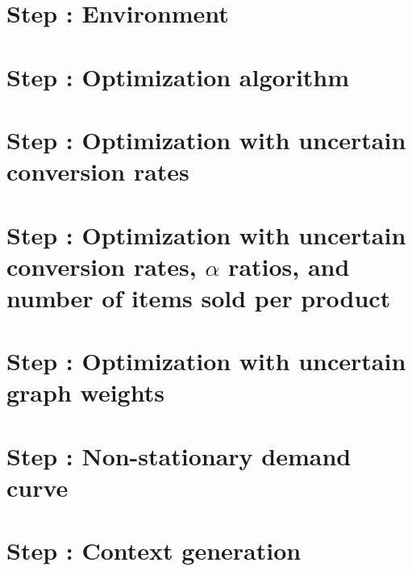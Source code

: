 \documentclass{article}
\begin{document}
\section{Step : Environment}



\newpage
\section{Step : Optimization algorithm}



\newpage
\section{Step : Optimization with uncertain conversion rates}



\newpage
\section{Step : Optimization with uncertain conversion rates, $\alpha$ ratios, and number of items sold per product}


\newpage
\section{Step : Optimization with uncertain graph weights}


\newpage
\section{Step : Non-stationary demand curve}


\newpage
\section{Step : Context generation}

\end{document}
